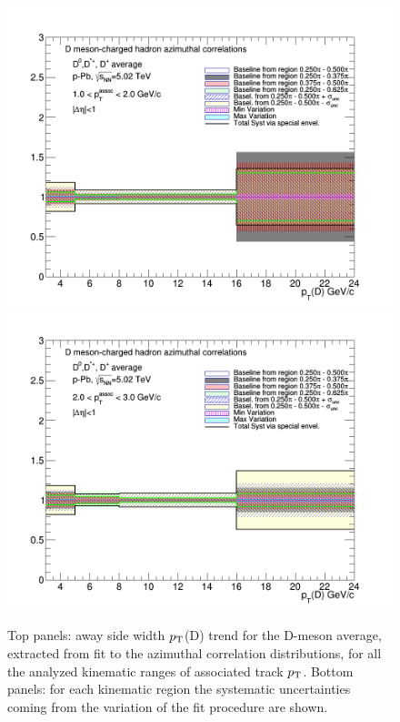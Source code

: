 \begin{figure}[!htbp]
{\includegraphics[width=0.49\linewidth, height=0.33\linewidth]{figures/FitOutput/BaselineSystematicSourcesASSigma_pthad1dotto2dot.png}}
{\includegraphics[width=0.49\linewidth, height=0.33\linewidth]{figures/FitOutput/BaselineSystematicSourcesASSigma_pthad2dotto3dot.png}}

\caption{Top panels: away side width $p_{\rm T}$(D) trend for the D-meson average, extracted from fit to the azimuthal correlation distributions, for all the analyzed kinematic ranges of associated track $p_{\rm T}$. Bottom panels: for each kinematic region the systematic uncertainties coming from the variation of the fit procedure are shown.}
\label{fig:awaysidesigmaAverage}
\end{figure}

